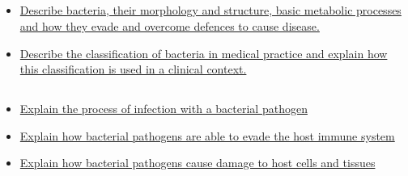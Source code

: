 \documentclass[10pt, a4paper]{article}
\newcommand{\MYhref}[3][blue]{\href{#2}{\color{#1}{#3}}}%
\begin{document}
\subsection{\MYhref[melbBlue]{https://notion.so/147097dae12b4b9798ba666656b9f874}{Introduction to Bacteria}} \begin{itemize} \item \href{https://www.notion.so/034d7e2308754bdfbdecd0dae6febbc5}{Describe bacteria, their morphology and structure, basic metabolic processes and how they evade and overcome defences to cause disease.} \item \href{https://www.notion.so/b4052db2b8b1425b9b570d4a6e843758}{Describe the classification of bacteria in medical practice and explain how this classification is used in a clinical context.} \end{itemize}
\subsection{\MYhref[melbBlue]{https://notion.so/78e75a3e45964003acf9287bd81d1bc9}{Bacterial Pathogenesis}} \begin{itemize} \item \href{https://www.notion.so/ba2b675d036d4f3d8ba708157db952a1}{Explain the process of infection with a bacterial pathogen} \item \href{https://www.notion.so/96cb633fd935424ebec6cc01017cd40c}{Explain how bacterial pathogens are able to evade the host immune system} \item \href{https://www.notion.so/52439eb78eb54e42bef89dd495bfe1fb}{Explain how bacterial pathogens cause damage to host cells and tissues} \end{itemize}
\end{document}
